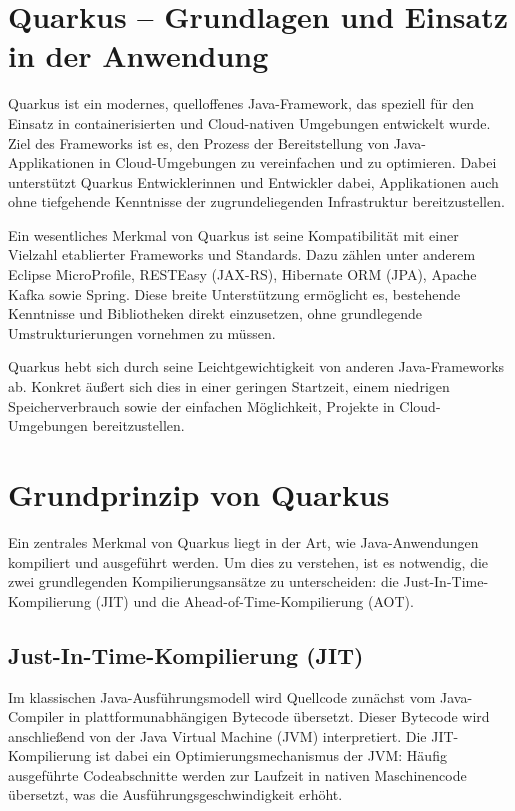 \section{Quarkus – Grundlagen und Einsatz in der Anwendung}

Quarkus ist ein modernes, quelloffenes Java-Framework, das speziell für den Einsatz 
in containerisierten und Cloud-nativen Umgebungen entwickelt wurde. Ziel des Frameworks 
ist es, den Prozess der Bereitstellung von Java-Applikationen in Cloud-Umgebungen zu 
vereinfachen und zu optimieren. Dabei unterstützt Quarkus Entwicklerinnen und Entwickler 
dabei, Applikationen auch ohne tiefgehende Kenntnisse der zugrundeliegenden Infrastruktur 
bereitzustellen.

Ein wesentliches Merkmal von Quarkus ist seine Kompatibilität mit einer Vielzahl 
etablierter Frameworks und Standards. Dazu zählen unter anderem Eclipse MicroProfile, 
RESTEasy (JAX-RS), Hibernate ORM (JPA), Apache Kafka sowie Spring. Diese breite 
Unterstützung ermöglicht es, bestehende Kenntnisse und Bibliotheken direkt einzusetzen, 
ohne grundlegende Umstrukturierungen vornehmen zu müssen.

Quarkus hebt sich durch seine Leichtgewichtigkeit von anderen Java-Frameworks ab. 
Konkret äußert sich dies in einer geringen Startzeit, einem niedrigen Speicherverbrauch 
sowie der einfachen Möglichkeit, Projekte in Cloud-Umgebungen bereitzustellen.


\section{Grundprinzip von Quarkus}

Ein zentrales Merkmal von Quarkus liegt in der Art, wie Java-Anwendungen kompiliert 
und ausgeführt werden. Um dies zu verstehen, ist es notwendig, die zwei grundlegenden 
Kompilierungsansätze zu unterscheiden: die Just-In-Time-Kompilierung (JIT) und die 
Ahead-of-Time-Kompilierung (AOT).

\subsection{Just-In-Time-Kompilierung (JIT)}

Im klassischen Java-Ausführungsmodell wird Quellcode zunächst vom Java-Compiler in 
plattformunabhängigen Bytecode übersetzt. Dieser Bytecode wird anschließend von der 
Java Virtual Machine (JVM) interpretiert. Die JIT-Kompilierung ist dabei ein 
Optimierungsmechanismus der JVM: Häufig ausgeführte Codeabschnitte werden zur Laufzeit 
in nativen Maschinencode übersetzt, was die Ausführungsgeschwindigkeit erhöht.

